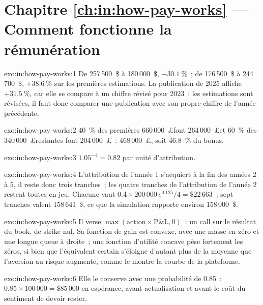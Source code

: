 \section*{Chapitre \ref{ch:in:how-pay-works} --- Comment fonctionne la rémunération}

\begin{solution}{exo:in:how-pay-works:1}
De 257\,500~\$ à 180\,000~\$, $-30.1~\%$~; de 176\,500~\$ à 244\,700~\$, $+38.6~\%$ sur les premières estimations. La publication de 2025
affiche $+31.5~\%$, car elle se compare à un chiffre révisé pour 2023~: les estimations sont révisées, il faut donc comparer une publication
avec son propre chiffre de l'année précédente.
\end{solution}

\begin{solution}{exo:in:how-pay-works:2}
40~\% des premières 660\,000~\pounds font 264\,000~\pounds et 60~\% des 340\,000~\pounds restantes font 204\,000~\pounds~:
468\,000~\pounds, soit 46.8~\% du bonus.
\end{solution}

\begin{solution}{exo:in:how-pay-works:3}
$1.05^{-4}=0.82$ par unité d'attribution.
\end{solution}

\begin{solution}{exo:in:how-pay-works:4}
L'attribution de l'année 1 s'acquiert à la fin des années 2 à 5, il reste donc trois tranches~; les quatre tranches de l'attribution de l'année 2
restent toutes en jeu. Chacune vaut $0.4\times200\,000\,e^{0.125}/4=\$22\,663$~; sept tranches valent 158\,641~\$, ce que la simulation
rapporte environ 158\,000~\$.
\end{solution}

\begin{solution}{exo:in:how-pay-works:5}
Il verse $\max(\text{action}\times\text{P\&L},0)$~: un call sur le résultat du book, de strike nul. Sa fonction de gain est convexe, avec une
masse en zéro et une longue queue à droite~; une fonction d'utilité concave pèse fortement les zéros, si bien que l'équivalent certain
s'éloigne d'autant plus de la moyenne que l'aversion au risque augmente, comme le montre la courbe de la plateforme.
\end{solution}

\begin{solution}{exo:in:how-pay-works:6}
Elle le conserve avec une probabilité de 0.85~: $0.85\times100\,000=\$85\,000$ en espérance, avant actualisation et avant le
coût du sentiment de devoir rester.
\end{solution}

